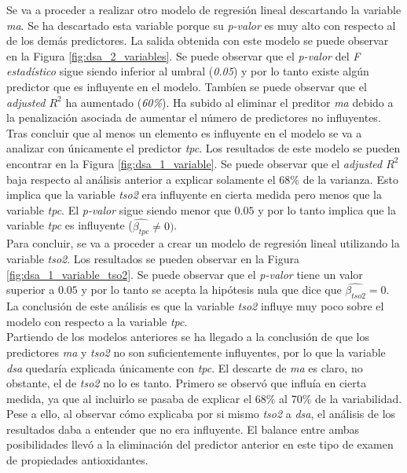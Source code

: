 \documentclass{article}
\begin{document}
Se va a proceder a realizar otro modelo de regresión lineal descartando la variable \textit{ma}. Se ha descartado esta variable porque su \textit{p-valor} es muy alto con respecto al de los demás predictores. La salida obtenida con este modelo se puede observar en la Figura \ref{fig:dsa_2_variables}. Se puede observar que el \textit{p-valor} del \textit{F estadístico} sigue siendo inferior al umbral (\textit{0.05}) y por lo tanto existe algún predictor que es influyente en el modelo. Tambíen se puede observar que el \textit{adjusted $R^2$} ha aumentado (\textit{60\%}). Ha subido al eliminar el preditor \textit{ma} debido a la penalización asociada de aumentar el número de predictores no influyentes.\\

Tras concluir que al menos un elemento es influyente en el modelo se va a analizar con únicamente el predictor \textit{tpc}. Los resultados de este modelo se pueden encontrar en la Figura \ref{fig:dsa_1_variable}. Se puede observar que el \textit{adjusted $R^2$} baja respecto al análisis anterior a explicar solamente el 68\% de la varianza. Esto implica que la variable \textit{tso2} era influyente en cierta medida pero menos que la variable \textit{tpc}. El \textit{p-valor} sigue siendo menor que $0.05$ y por lo tanto implica que la variable \textit{tpc} es influyente ($\hat{\beta_{tpc}}\neq0)$.\\

Para concluir, se va a proceder a crear un modelo de regresión lineal utilizando la variable \textit{tso2}. Los resultados se pueden observar en la Figura \ref{fig:dsa_1_variable_tso2}. Se puede observar que el \textit{p-valor} tiene un valor superior a $0.05$ y por lo tanto se acepta la hipótesis nula que dice que $\hat{\beta_{tso2}}=0$. La conclusión de este análisis es que la variable \textit{tso2} influye muy poco sobre el modelo con respecto a la variable \textit{tpc}.\\

Partiendo de los modelos anteriores se ha llegado a la conclusión de que los predictores \textit{ma} y \textit{tso2} no son suficientemente influyentes, por lo que la variable \textit{dsa} quedaría explicada únicamente con \textit{tpc}. El descarte de \textit{ma} es claro, no obstante, el de \textit{tso2} no lo es tanto. Primero se observó que influía en cierta medida, ya que al incluirlo se pasaba de explicar el 68\% al 70\% de la variabilidad. Pese a ello, al observar cómo explicaba por si mismo \textit{tso2} a \textit{dsa}, el análisis de los resultados daba a entender que no era influyente. El balance entre ambas posibilidades llevó a la eliminación del predictor anterior en este tipo de examen de propiedades antioxidantes.\\
\end{document}
